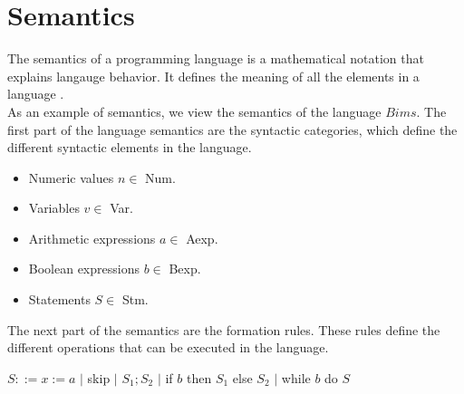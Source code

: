 \section{Semantics}
\label{sec:semantics}

The semantics of a programming language is a mathematical notation that explains langauge behavior. 
It defines the meaning of all the elements in a language \cite{misc:sem}.\\ \indent
As an example of semantics, we view the semantics of the language $Bims$. 
The first part of the language semantics are the syntactic categories, which define the different syntactic elements in the language.

\begin{itemize}
\item Numeric values $n \in$ Num.
\item Variables $v \in$ Var.
\item Arithmetic expressions $a \in$ Aexp.
\item Boolean expressions $b \in$ Bexp.
\item Statements $S \in$ Stm.
\end{itemize}

The next part of the semantics are the formation rules. 
These rules define the different operations that can be executed in the language. 

$S ::= x := a$ $|$ skip $|$ $S_1;S_2$ $|$ if $b$ then $S_1$ else $S_2$ $|$ while $b$ do $S$